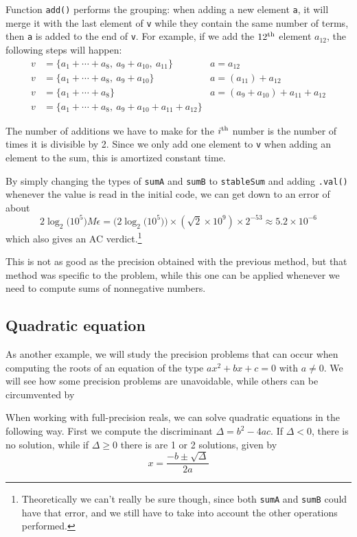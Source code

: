 Function \lstinline|add()| performs the grouping: when adding a new element \lstinline|a|, it will merge it with the last element of \lstinline|v| while they contain the same number of terms, then \lstinline|a| is added to the end of \lstinline|v|. For example, if we add the $12^{\mathrm{th}}$ element $a_{12}$, the following steps will happen:
\begin{align*}
v &= \{a_1+\cdots+a_8,\ a_9+a_{10},\ a_{11}\} \quad &a = a_{12}\\
v &= \{a_1+\cdots+a_8,\ a_9+a_{10}\} \quad &a = (a_{11})+a_{12}\\
v &= \{a_1+\cdots+a_8\} \quad &a = (a_9+a_{10})+a_{11}+a_{12}\\
v &= \{a_1+\cdots+a_8,\ a_9+a_{10}+a_{11}+a_{12}\}
\end{align*}

The number of additions we have to make for the $i^{\mathrm{th}}$ number is the number of times it is divisible by 2. Since we only add one element to \lstinline|v| when adding an element to the sum, this is amortized constant time.

By simply changing the types of \lstinline|sumA| and \lstinline|sumB| to \lstinline|stableSum| and adding \lstinline|.val()| whenever the value is read in the initial code, we can get down to an error of about
\[2\log_2\big(10^5\big) M \epsilon = \Big(2\log_2\big(10^5\big)\Big) \times \left(\sqrt{2} \times 10^9\right) \times 2^{-53} \approx 5.2 \times 10^{-6}\]
which also gives an AC verdict.\footnote{Theoretically we can't really be sure though, since both \lstinline|sumA| and \lstinline|sumB| could have that error, and we still have to take into account the other operations performed.}

This is not as good as the precision obtained with the previous method, but that method was specific to the problem, while this one can be applied whenever we need to compute sums of nonnegative numbers.

\subsection{Quadratic equation}
As another example, we will study the precision problems that can occur when computing the roots of an equation of the type $ax^2+bx+c=0$ with $a\neq 0$. We will see how some precision problems are unavoidable, while others can be circumvented by 

When working with full-precision reals, we can solve quadratic equations in the following way. First we compute the discriminant $\Delta = b^2-4ac$. If $\Delta < 0$, there is no solution, while if $\Delta \geq 0$ there is are 1 or 2 solutions, given by \[x = \frac{-b \pm \sqrt{\Delta}}{2a}\]

